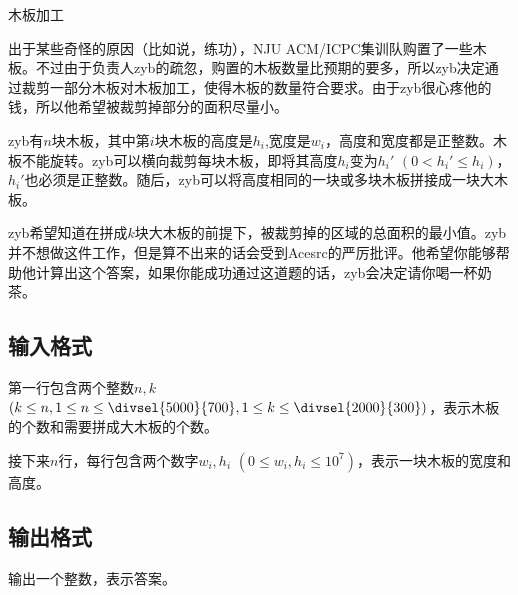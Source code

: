 \begin{Problem}{木板加工}{}

出于某些奇怪的原因（比如说，练功），NJU ACM/ICPC集训队购置了一些木板。不过由于负责人zyb的疏忽，购置的木板数量比预期的要多，所以zyb决定通过裁剪一部分木板对木板加工，使得木板的数量符合要求。由于zyb很心疼他的钱，所以他希望被裁剪掉部分的面积尽量小。

zyb有$n$块木板，其中第$i$块木板的高度是$h_i$,宽度是$w_i$，高度和宽度都是正整数。木板不能旋转。zyb可以横向裁剪每块木板，即将其高度$h_i$变为$h_i'$ $(0 < h_i' \leq h_i)$，$h_i'$也必须是正整数。随后，zyb可以将高度相同的一块或多块木板拼接成一块大木板。

zyb希望知道在拼成$k$块大木板的前提下，被裁剪掉的区域的总面积的最小值。zyb并不想做这件工作，但是算不出来的话会受到Acesrc的严厉批评。他希望你能够帮助他计算出这个答案，如果你能成功通过这道题的话，zyb会决定请你喝一杯奶茶。

\subsection*{输入格式}

第一行包含两个整数$n, k$ $(k \leq n, 1 \leq n \leq \divsel{5000}{700}, 1 \leq k \leq \divsel{2000}{300})$，表示木板的个数和需要拼成大木板的个数。

接下来$n$行，每行包含两个数字$w_i, h_i$ $(0 \leq w_i, h_i \leq 10^7)$，表示一块木板的宽度和高度。

\subsection*{输出格式}

输出一个整数，表示答案。


\end{Problem}


